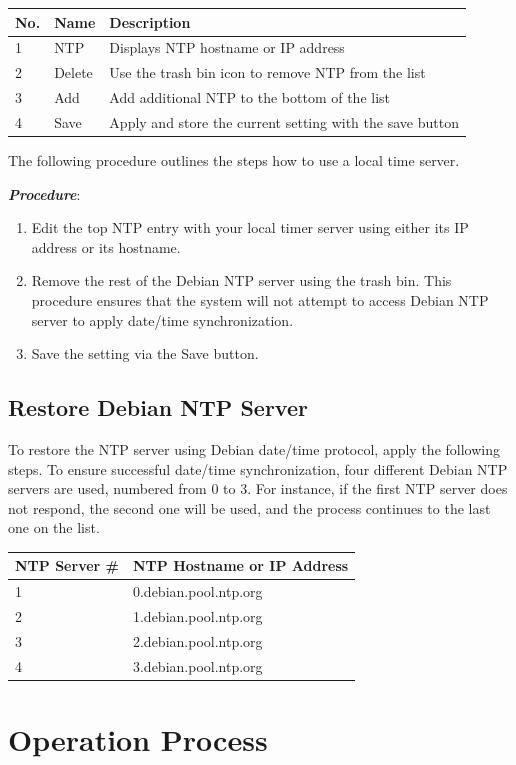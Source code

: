 \begin{longtable}[]{@{}|l|l|l|@{}}
\toprule
No. & Name & Description\tabularnewline
\midrule
\endhead
1 & NTP & Displays NTP hostname or IP address\tabularnewline
2 & Delete & Use the trash bin icon to remove NTP from the
list\tabularnewline
3 & Add & Add additional NTP to the bottom of the list\tabularnewline
4 & Save & Apply and store the current setting with the save
button\tabularnewline
\bottomrule
\end{longtable}

The following procedure outlines the steps how to use a local time
server.

\textbf{\emph{Procedure}}:

\begin{enumerate}
\def\labelenumi{\arabic{enumi}.}
\tightlist
\item
  Edit the top NTP entry with your local timer server using either its
  IP address or its hostname.
\item
  Remove the rest of the Debian NTP server using the trash bin. This
  procedure ensures that the system will not attempt to access Debian
  NTP server to apply date/time synchronization.
\item
  Save the setting via the Save button.
\end{enumerate}


\subsection{Restore Debian NTP
Server}

To restore the NTP server using Debian date/time protocol, apply the
following steps. To ensure successful date/time synchronization, four
different Debian NTP servers are used, numbered from 0 to 3. For
instance, if the first NTP server does not respond, the second one will
be used, and the process continues to the last one on the list.

\begin{longtable}[]{@{}|l|l|@{}}
\toprule
NTP Server \# & NTP Hostname or IP Address\tabularnewline
\midrule
\endhead
1 & 0.debian.pool.ntp.org\tabularnewline
2 & 1.debian.pool.ntp.org\tabularnewline
3 & 2.debian.pool.ntp.org\tabularnewline
4 & 3.debian.pool.ntp.org\tabularnewline
\bottomrule
\end{longtable}


\section{Operation Process}

